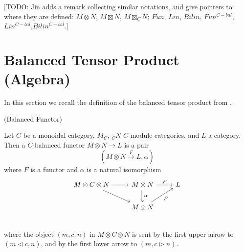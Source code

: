 [TODO: Jin adds a remark collecting similar notations, and give pointers to where they are defined: $M \otimes N$, $M \boxtimes N$, $M \boxtimes_{C} N$; $Fun$, $Lin$, $Bilin$, $Fun^{C-bal}$, $Lin^{C-bal}$,$Bilin^{C-bal}$.]





\section{Balanced Tensor Product (Algebra)}\label{section/balanced-tensor-product}

\noindent In this section we recall the definition of the balanced tensor product
from \cite{douglas/balanced-product}.

\begin{definition} (Balanced Functor)

  \noindent Let $C$ be a monoidal category, $M_{C}$, $_{C}N$ $C$-module categories, and $L$ a category. \quad Then a
  $C$-balanced functor $M \otimes N\to L$
  is a pair
  \[(M \otimes N \xrightarrow{F} L, \alpha)\] where $F$ is a functor and $\alpha$ is a natural isomorphism
  \[
    \begin{tikzcd}
      M \otimes C \otimes N \arrow[r] \arrow[dr] &
      M \otimes N \arrow[d, Rightarrow, "\alpha"] \arrow[r, "F"] &
      L \\
      & M \otimes N \arrow[ur, "F"'] \\
    \end{tikzcd}
  \]
  where the object $(m,c,n)$ in $M \otimes C \otimes N$ is sent by the first
  upper arrow to $(m \lhd c, n)$, and by the first lower arrow to $(m, c \rhd n)$.
\end{definition}%

